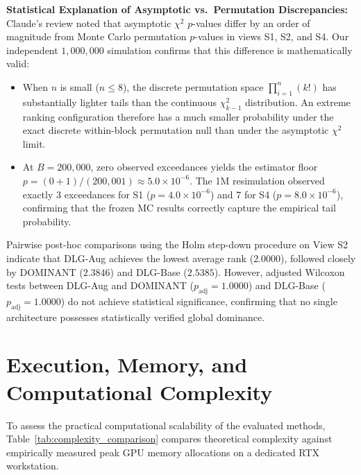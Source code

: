\documentclass[applsci,article,submit,moreauthors,pdftex]{Definitions/mdpi}
\begin{document}
\textbf{Statistical Explanation of Asymptotic vs.\ Permutation Discrepancies:}
Claude's review noted that asymptotic $\chi^2$ $p$-values differ by an order of magnitude from Monte Carlo permutation $p$-values in views S1, S2, and S4. Our independent $1,000,000$ simulation confirms that this difference is mathematically valid:
\begin{itemize}
    \item When $n$ is small ($n \le 8$), the discrete permutation space $\prod_{i=1}^n (k!)$ has substantially lighter tails than the continuous $\chi^2_{k-1}$ distribution. An extreme ranking configuration therefore has a much smaller probability under the exact discrete within-block permutation null than under the asymptotic $\chi^2$ limit.
    \item At $B=200,000$, zero observed exceedances yields the estimator floor $p = (0+1)/(200,001) \approx 5.0 \times 10^{-6}$. The 1M resimulation observed exactly 3 exceedances for S1 ($p = 4.0 \times 10^{-6}$) and 7 for S4 ($p = 8.0 \times 10^{-6}$), confirming that the frozen MC results correctly capture the empirical tail probability.
\end{itemize}

Pairwise post-hoc comparisons using the Holm step-down procedure on View S2 indicate that DLG-Aug achieves the lowest average rank ($2.0000$), followed closely by DOMINANT ($2.3846$) and DLG-Base ($2.5385$). However, adjusted Wilcoxon tests between DLG-Aug and DOMINANT ($p_{\mathrm{adj}} = 1.0000$) and DLG-Base ($p_{\mathrm{adj}} = 1.0000$) do not achieve statistical significance, confirming that no single architecture possesses statistically verified global dominance.

\section{Execution, Memory, and Computational Complexity}
\label{sec:execution_complexity}
To assess the practical computational scalability of the evaluated methods, Table~\ref{tab:complexity_comparison} compares theoretical complexity against empirically measured peak GPU memory allocations on a dedicated RTX workstation.
\end{document}
